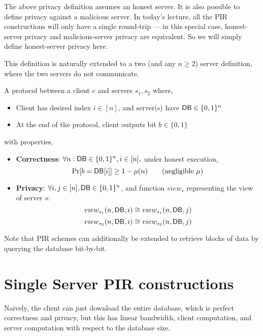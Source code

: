 \begin{remark}
The above privacy definition assumes an honest server.
It is also possible to define privacy against a malicious server.
In today's lecture, all the PIR constructions
will only have a single round-trip --- 
in this special case, honest-server privacy
and malicious-server
privacy are equivalent. So we will simply define honest-server privacy here.
\end{remark}



This definition is naturally extended to a two (and any $n \geq 2$) server definition, where the two servers do not communicate.




\begin{definition}
A protocol between a client $c$ and servers $s_{1},s_{2}$ where,
\begin{itemize}
	\item Client has desired index $i \in [n]$, and server(s) have ${\sf DB} \in \{0,1\}^n$
	\item At the end of the protocol, client outputs bit $b \in \{0,1\}$
\end{itemize}
with properties,
\begin{itemize}

	\item \textbf{Correctness}: $\forall n: {\sf DB} \in \{0,1\}^n, i \in [n],$ under honest execution, 
	\[\Pr[b = {\sf DB}[i]] \geq 1 - \mu(n) \tag{negligible $\mu$}\]
	
	\item \textbf{Privacy}: $\forall i,j \in [n], {\sf DB}  \in \{0,1\}^n$, and function $view_{s}$ representing the view of server $s$:
	\[view_{s_{1}}(n,{\sf DB},i) \cong view_{s_{1}}(n,{\sf DB},j)\]
	\[view_{s_{2}}(n,{\sf DB},i) \cong view_{s_{2}}(n,{\sf DB},j)\]
\end{itemize}
\end{definition}


Note that PIR schemes can additionally be extended to retrieve blocks of data by querying the database bit-by-bit.
\section{Single Server PIR constructions}
Naively, the client can just download the entire database, which is perfect correctness and privacy, but this has linear bandwidth, client computation, and server computation with respect to the database size.

